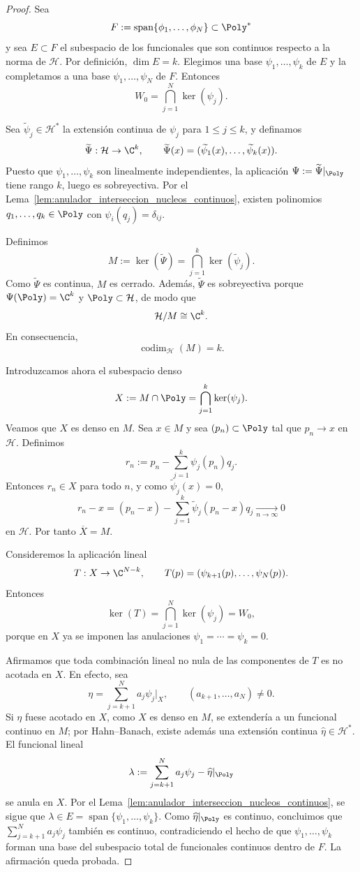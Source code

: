 \begin{proof}
	Sea
	\[
		F:=\operatorname{span}\{\phi_1,\dots,\phi_N\}\subset \Poly^*
	\]
	y sea $E\subset F$ el subespacio de los funcionales que son continuos respecto a la norma de $\mathcal H$. Por definición, $\dim E=k$. Elegimos una base $\psi_1,\dots,\psi_k$ de $E$ y la completamos a una base $\psi_1,\dots,\psi_N$ de $F$. Entonces
	\[
		W_0=\bigcap_{j=1}^N\ker(\psi_j).
	\]

	Sea $\widetilde\psi_j\in\mathcal H^*$ la extensión continua de $\psi_j$ para $1\le j\le k$, y definamos
	\[
		\widetilde\Psi:\mathcal H\to\C^k,
		\qquad
		\widetilde\Psi(x)=(\widetilde\psi_1(x),\dots,\widetilde\psi_k(x)).
	\]
	Puesto que $\psi_1,\dots,\psi_k$ son linealmente independientes, la aplicación $\Psi:=\widetilde\Psi|_{\Poly}$ tiene rango $k$, luego es sobreyectiva. Por el Lema~\ref{lem:anulador_interseccion_nucleos_continuos}, existen polinomios $q_1,\dots,q_k\in\Poly$ con $\psi_i(q_j)=\delta_{ij}$.

	Definimos
	\[
		M:=\ker(\widetilde\Psi)=\bigcap_{j=1}^k\ker(\widetilde\psi_j).
	\]
	Como $\widetilde\Psi$ es continua, $M$ es cerrado. Además, $\widetilde\Psi$ es sobreyectiva porque $\Psi(\Poly)=\C^k$ y $\Poly\subset\mathcal H$, de modo que
	\[
		\mathcal H/M\cong \C^k.
	\]
	En consecuencia,
	\[
		\operatorname{codim}_{\mathcal H}(M)=k.
	\]

	Introduzcamos ahora el subespacio denso
	\[
		X:=M\cap \Poly=\bigcap_{j=1}^k\ker(\psi_j).
	\]
	Veamos que $X$ es denso en $M$. Sea $x\in M$ y sea $(p_n)\subset\Poly$ tal que $p_n\to x$ en $\mathcal H$. Definimos
	\[
		r_n:=p_n-\sum_{j=1}^k\psi_j(p_n)q_j.
	\]
	Entonces $r_n\in X$ para todo $n$, y como $\widetilde\psi_j(x)=0$,
	\[
		r_n-x=(p_n-x)-\sum_{j=1}^k\widetilde\psi_j(p_n-x)q_j\xrightarrow[n\to\infty]{}0
	\]
	en $\mathcal H$. Por tanto $\overline X=M$.

	Consideremos la aplicación lineal
	\[
		T:X\to\C^{N-k},
		\qquad
		T(p)=(\psi_{k+1}(p),\dots,\psi_N(p)).
	\]
	Entonces
	\[
		\ker(T)=\bigcap_{j=1}^N\ker(\psi_j)=W_0,
	\]
	porque en $X$ ya se imponen las anulaciones $\psi_1=\cdots=\psi_k=0$.

	Afirmamos que toda combinación lineal no nula de las componentes de $T$ es no acotada en $X$. En efecto, sea
	\[
		\eta=\sum_{j=k+1}^N a_j\psi_j|_X,
		\qquad (a_{k+1},\dots,a_N)\neq 0.
	\]
	Si $\eta$ fuese acotado en $X$, como $X$ es denso en $M$, se extendería a un funcional continuo en $M$; por Hahn--Banach, existe además una extensión continua $\widehat\eta\in\mathcal H^*$. El funcional lineal
	\[
		\lambda:=\sum_{j=k+1}^N a_j\psi_j-\widehat\eta|_{\Poly}
	\]
	se anula en $X$. Por el Lema~\ref{lem:anulador_interseccion_nucleos_continuos}, se sigue que $\lambda\in E=\operatorname{span}\{\psi_1,\dots,\psi_k\}$. Como $\widehat\eta|_{\Poly}$ es continuo, concluimos que $\sum_{j=k+1}^N a_j\psi_j$ también es continuo, contradiciendo el hecho de que $\psi_1,\dots,\psi_k$ forman una base del subespacio total de funcionales continuos dentro de $F$. La afirmación queda probada.


\end{proof}
